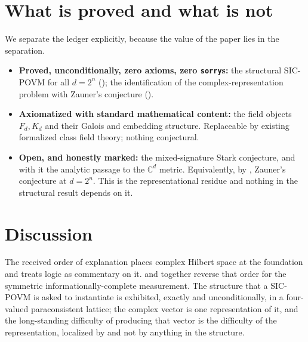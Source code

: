 \documentclass[12pt,a4paper]{article}
\begin{document}
\section{What is proved and what is not}

We separate the ledger explicitly, because the value of the paper lies in the
separation.

\begin{itemize}
\item \textbf{Proved, unconditionally, zero axioms, zero \texttt{sorry}s:} the
structural SIC-POVM for all $d = 2^n$ (); the
identification of the complex-representation problem with Zauner's conjecture
().
\item \textbf{Axiomatized with standard mathematical content:} the field
objects $F_d, K_d$ and their Galois and embedding structure. Replaceable by
existing formalized class field theory; nothing conjectural.
\item \textbf{Open, and honestly marked:} the mixed-signature Stark conjecture,
and with it the analytic passage to the $\mathbb{C}^d$ metric. Equivalently, by
, Zauner's conjecture at $d = 2^n$. This is the
representational residue and nothing in the structural result depends on it.
\end{itemize}

\section{Discussion}

The received order of explanation places complex Hilbert space at the
foundation and treats logic as commentary on it.  and
 together reverse that order for the symmetric
informationally-complete measurement. The structure that a SIC-POVM is asked to
instantiate is exhibited, exactly and unconditionally, in a four-valued
paraconsistent lattice; the complex vector is one representation of it, and the
long-standing difficulty of producing that vector is the difficulty of the
representation, localized by  and not by anything in
the structure.
\end{document}
